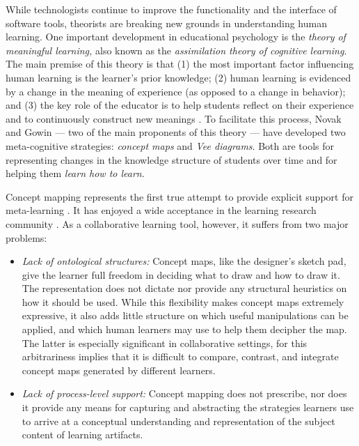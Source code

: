 While technologists continue to improve the functionality and the interface
of software tools, theorists are breaking new grounds in understanding
human learning. One important development in educational psychology is the
{\it theory of meaningful learning,\/} also known as the {\it assimilation
theory of cognitive learning\/}. The main premise of this theory is that
(1) the most important factor influencing human learning is the learner's
prior knowledge; (2) human learning is evidenced by a change in the meaning
of experience (as opposed to a change in behavior); and (3) the key role of
the educator is to help students reflect on their experience and to
continuously construct new meanings \cite{Ausubel63,Ausubel78}. To
facilitate this process, Novak and Gowin \cite{Novak84} --- two of the main
proponents of this theory --- have developed two meta-cognitive strategies: {\it
concept maps\/} and {\it Vee diagrams\/}. Both are tools for representing
changes in the knowledge structure of students over time and for helping
them {\it learn how to learn\/}.

Concept mapping represents the first true attempt to provide explicit
support for meta-learning \cite{Novak84}. It has enjoyed a wide acceptance
in the learning research community \cite{Cliburn90,Novak90,Roth92}. As a
collaborative learning tool, however, it suffers from two major problems:

\begin{itemize}
\item {\it Lack of ontological structures:\/} Concept maps, like the
  designer's sketch pad, give the learner full freedom in deciding what to
  draw and how to draw it. The representation does not dictate nor provide
  any structural heuristics on how it should be used. While this
  flexibility makes concept maps extremely expressive, it also adds little
  structure on which useful manipulations can be applied, and which human
  learners may use to help them decipher the map. The latter is especially
  significant in collaborative settings, for this arbitrariness implies
  that it is difficult to compare, contrast, and integrate concept maps
  generated by different learners.
  
\item {\it Lack of process-level support:\/} Concept mapping does not
  prescribe, nor does it provide any means for capturing and abstracting
  the strategies learners use to arrive at a conceptual understanding and
  representation of the subject content of learning artifacts.
\end{itemize}

